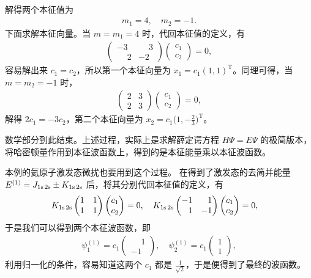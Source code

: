 {\begin{align}
\end{align}
解得两个本征值为
\begin{align}
    m_1 = 4, \quad m_2 = -1. 
\end{align}
下面求解本征向量。当 $m = m_1 = 4$ 时，代回本征值的定义，有
\begin{align}
    \begin{pmatrix}
        -3 & \phantom{-}3 \\ \phantom{-}2 & -2
    \end{pmatrix}
    \begin{pmatrix}
        c_1 \\ c_2
    \end{pmatrix} = 0,
\end{align}
容易解出来 $c_1 = c_2$，所以第一个本征向量为 $x_1 = c_1 (1, 1)^{\text{T}}$。同理可得，当 $m=m_2=-1$ 时，
\begin{align}
    \begin{pmatrix}
        2 & 3 \\ 2 & 3
    \end{pmatrix}
    \begin{pmatrix}
        c_1 \\ c_2
    \end{pmatrix} = 0,
\end{align}
解得 $2c_1 = - 3c_2$，第二个本征向量为 $x_2 = c_1 \big(1, -\frac23\big)^{\text{T}}$。

数学部分到此结束。上述过程，实际上是求解薛定谔方程 $H\Psi = E\Psi$ 的极简版本，将哈密顿量作用到本征波函数上，得到的是本征能量乘以本征波函数。

本例的氦原子激发态微扰也要用到这个过程。
在得到了激发态的去简并能量 $E^{(1)} = J_{\text{1s\,2s}} \pm K_{\text{1s\,2s}}$ 后，将其分别代回本征值的定义，有
\begin{align}
K_{\text{1s\,2s}}
\begin{pmatrix}
1 & 1 \\ 1 & 1
\end{pmatrix}
\begin{pmatrix}
c_1 \\ c_2 
\end{pmatrix} = 0, \quad 
K_{\text{1s\,2s}}
\begin{pmatrix}
-1 & \phantom{-}1 \\ \phantom{-}1 & -1
\end{pmatrix}
\begin{pmatrix}
c_1 \\ c_2 
\end{pmatrix} = 0, \quad 
\end{align}
于是我们可以得到两个本征波函数，即
\begin{align}
\psi_1^{(1)} = c_1 \begin{pmatrix}
    \phantom{-}1 \\ -1
\end{pmatrix}, \quad
\psi_2^{(1)} = c_1 \begin{pmatrix}
    1 \\ 1
\end{pmatrix},
\end{align}
利用归一化的条件，容易知道这两个 $c_1$ 都是 $\frac1{\sqrt2}$，于是便得到了最终的波函数。
}

